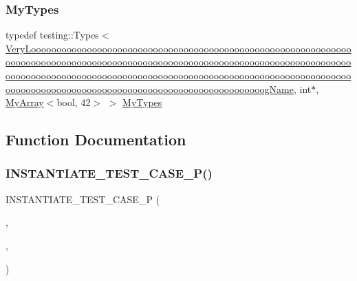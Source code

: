 \subsubsection{\texorpdfstring{MyTypes}{MyTypes}}
{\footnotesize\ttfamily typedef testing\+::\+Types$<$\mbox{\hyperlink{class_very_loooooooooooooooooooooooooooooooooooooooooooooooooooooooooooooooooooooooooooooooooooo570db76e21fa868abfe0f6323a68c9ba}{Very\+Loooooooooooooooooooooooooooooooooooooooooooooooooooooooooooooooooooooooooooooooooooooooooooooooooooooooooooooooooooooooooooooooooooooooooooooooooooooooooooooooooooooooooooooooooooooooooooooooooooooooooooooooooooooooooooooooooooooooooooooooooooooooooog\+Name}}, int$\ast$, \mbox{\hyperlink{class_my_array}{My\+Array}}$<$bool, 42$>$ $>$ \mbox{\hyperlink{googletest-master_2googletest_2test_2googletest-list-tests-unittest___8cc_a16f58cd49c18568802322bbaf9f3f654}{My\+Types}}}



\subsection{Function Documentation}
\mbox{\label{_obj__test_2lib_2googletest-release-1_88_81_2googletest_2test_2googletest-list-tests-unittest___8cc_aae3f9f4ba0f7ea179b0976679d0906c6}} 
\subsubsection{\texorpdfstring{INSTANTIATE\_TEST\_CASE\_P()}{INSTANTIATE\_TEST\_CASE\_P()}}
{\footnotesize\ttfamily I\+N\+S\+T\+A\+N\+T\+I\+A\+T\+E\+\_\+\+T\+E\+S\+T\+\_\+\+C\+A\+S\+E\+\_\+P (\begin{DoxyParamCaption}\item[{My\+Instantiation}]{,  }\item[{\mbox{\hyperlink{class_value_param_test}{Value\+Param\+Test}}}]{,  }\item[{\mbox{\hyperlink{namespacetesting_abd3c87b40c2a0663691c9b617ed5fcc2}{testing\+::\+Values}}(\mbox{\hyperlink{class_my_type}{My\+Type}}(\char`\"{}one line\char`\"{}), My\+Type(\char`\"{}two\textbackslash{}nlines\char`\"{}), My\+Type(\char`\"{}a very\textbackslash{}nloooooooooooooooooooooooooooooooooooooooooooooooooooooooooooooooooooooooooooooooooooooooooooooooooooooooooooooooooooooooooooooooooooooooooooooooooooooooooooooooooooooooooooooooooooooooooooooooooooooooooooooooooooooooooooooooooooooooooooooooooooooooooong line\char`\"{}))}]{ }\end{DoxyParamCaption})}


